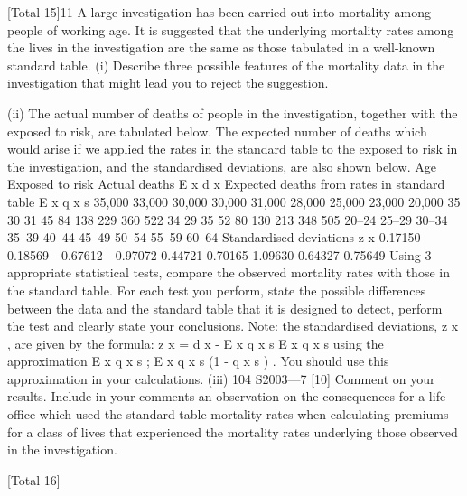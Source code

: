 \documentclass[a4paper,12pt]{article}
\begin{document}
[Total 15]11
A large investigation has been carried out into mortality among people of working
age. It is suggested that the underlying mortality rates among the lives in the
investigation are the same as those tabulated in a well-known standard table.
(i) Describe three possible features of the mortality data in the investigation that
might lead you to reject the suggestion.

(ii) The actual number of deaths of people in the investigation, together with the
exposed to risk, are tabulated below. The expected number of deaths which
would arise if we applied the rates in the standard table to the exposed to risk
in the investigation, and the standardised deviations, are also shown below.
Age
Exposed to risk Actual deaths E x d x Expected
deaths from
rates in
standard table
E x q x s
35,000
33,000
30,000
30,000
31,000
28,000
25,000
23,000
20,000 35
30
31
45
84
138
229
360
522 34
29
35
52
80
130
213
348
505
20–24
25–29
30–34
35–39
40–44
45–49
50–54
55–59
60–64
Standardised
deviations
z x
0.17150
0.18569
- 0.67612
- 0.97072
0.44721
0.70165
1.09630
0.64327
0.75649
Using 3 appropriate statistical tests, compare the observed mortality rates with
those in the standard table.
For each test you perform, state the possible differences between the data and
the standard table that it is designed to detect, perform the test and clearly state
your conclusions.
Note: the standardised deviations, z x , are given by the formula:
z x =
d x - E x q x s
E x q x s
using the approximation E x q x s ; E x q x s (1 - q x s ) . You should use this
approximation in your calculations.
(iii)
104 S2003—7
[10]
Comment on your results. Include in your comments an observation on the
consequences for a life office which used the standard table mortality rates
when calculating premiums for a class of lives that experienced the mortality
rates underlying those observed in the investigation.

[Total 16]
\newpage
\end{document}
